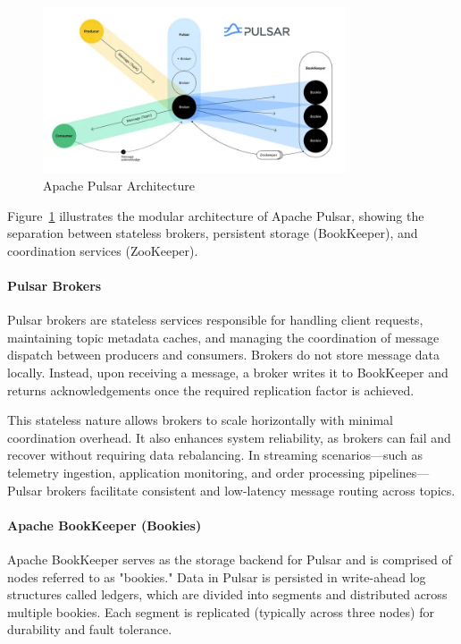 \begin{figure}[H]
\centering
\includegraphics[width=0.8\textwidth]{SOA/pulsar.png}
\caption{Apache Pulsar Architecture}
\label{fig:pulsar_architecture}
\end{figure}

Figure~\ref{fig:pulsar_architecture} illustrates the modular architecture of Apache Pulsar, showing the separation between stateless brokers, persistent storage (BookKeeper), and coordination services (ZooKeeper).

\paragraph{Pulsar Brokers}
Pulsar brokers are stateless services responsible for handling client requests, maintaining topic metadata caches, and managing the coordination of message dispatch between producers and consumers. Brokers do not store message data locally. Instead, upon receiving a message, a broker writes it to BookKeeper and returns acknowledgements once the required replication factor is achieved.

This stateless nature allows brokers to scale horizontally with minimal coordination overhead. It also enhances system reliability, as brokers can fail and recover without requiring data rebalancing. In streaming scenarios—such as telemetry ingestion, application monitoring, and order processing pipelines—Pulsar brokers facilitate consistent and low-latency message routing across topics.

\paragraph{Apache BookKeeper (Bookies)}
Apache BookKeeper serves as the storage backend for Pulsar and is comprised of nodes referred to as "bookies." Data in Pulsar is persisted in write-ahead log structures called ledgers, which are divided into segments and distributed across multiple bookies. Each segment is replicated (typically across three nodes) for durability and fault tolerance.

